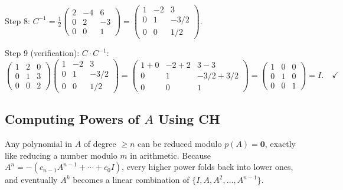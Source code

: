 \documentclass[12pt,a4paper]{article}
\begin{document}
Step 8: $C^{-1} = \tfrac{1}{2}\begin{pmatrix}2&-4&6\\0&2&-3\\0&0&1\end{pmatrix}
= \begin{pmatrix}1&-2&3\\0&1&-3/2\\0&0&1/2\end{pmatrix}$.

Step 9 (verification): $C \cdot C^{-1}$:
\[
  \begin{pmatrix}1&2&0\\0&1&3\\0&0&2\end{pmatrix}
  \begin{pmatrix}1&-2&3\\0&1&-3/2\\0&0&1/2\end{pmatrix}
  = \begin{pmatrix}1+0&-2+2&3-3\\0&1&-3/2+3/2\\0&0&1\end{pmatrix}
  = \begin{pmatrix}1&0&0\\0&1&0\\0&0&1\end{pmatrix} = I. \quad \checkmark
\]

\subsection{Computing Powers of $A$ Using CH}

Any polynomial in $A$ of degree $\geq n$ can be reduced modulo $p(A) = \mathbf{0}$,
exactly like reducing a number modulo $m$ in arithmetic.
Because $A^{n} = -(c_{n-1}A^{n-1}+\cdots+c_{0}I)$, every higher power folds back
into lower ones, and eventually $A^{k}$ becomes a linear combination of
$\{I, A, A^{2}, \ldots, A^{n-1}\}$.
\end{document}
